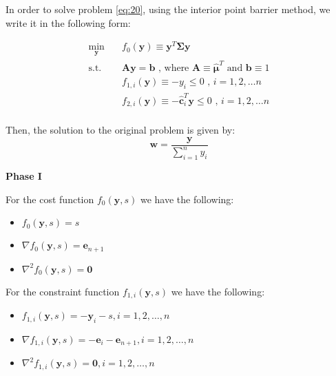 \documentclass{beamer}
\begin{document}
\begin{frame}


\justifying
In order to solve problem \eqref{eq:20}, using the interior point barrier method, we write it in the following form:

\justifying
\begin{equation}
\begin{aligned}
\label{eq:21}
\min_{\mathbf{y}} \quad & f_{0}\left(\mathbf{y}\right) \equiv \mathbf{y}^{T}\mathbf{\Sigma}\mathbf{y} \\
\textrm{s.t.} \quad & \mathbf{A} \mathbf{y} = \mathbf{b}  \textrm{ , where } \mathbf{A} \equiv \hat{\boldsymbol\mu}^{T} \textrm{ and } \mathbf{b} \equiv 1 \\
                             & f_{1,i}\left(\mathbf{y}\right) \equiv - y_{i} \leq 0 \textrm{ , } i = 1, 2, \dots n \\
                             & f_{2,i}\left(\mathbf{y}\right) \equiv -\hat{\mathbf{c}}_{i}^{T}\mathbf{y} \leq 0 \textrm{ , } i = 1, 2, \dots n \\
\end{aligned}
\end{equation}

\vspace{0.4cm}
\justifying
Then, the solution to the original problem is given by:
$$
\mathbf{w} = \frac{\mathbf{y}}{\sum_{i=1}^{n}y_{i}}
$$

\end{frame}




\begin{frame}

\textbf{Phase I}

\vspace{0.8cm}
\justifying

\justifying
For the cost function $f_{0}\left(\mathbf{y},s\right)$ we have the following:
\begin{itemize}
	\item $f_{0}\left(\mathbf{y},s\right) = s$
	\item $\nabla f_{0}\left(\mathbf{y},s\right) = \mathbf{e}_{n+1}$
	\item $\nabla^{2}f_{0}\left(\mathbf{y},s\right) = \mathbf{0}$
\end{itemize}

\vspace{0.8cm}
\justifying
For the constraint function $f_{1,i}\left(\mathbf{y},s\right)$ we have the following:
\begin{itemize}
	\item $f_{1,i}\left(\mathbf{y},s\right) = - \mathbf{y}_{i} - s, i=1,2,\dots,n$
	\item $\nabla f_{1,i}\left(\mathbf{y},s\right) = - \mathbf{e}_{i} - \mathbf{e}_{n+1}, i=1,2,\dots,n$
	\item $\nabla^{2}f_{1,i}\left(\mathbf{y},s\right) = \mathbf{0}, i=1,2,\dots,n$
\end{itemize}

\end{frame}
\end{document}
